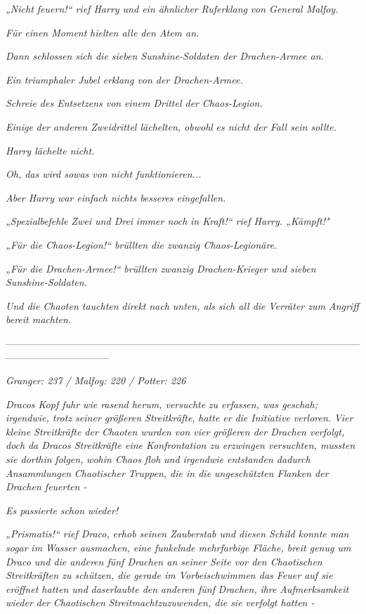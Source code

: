 {\emph{„Nicht feuern!“ rief Harry und ein ähnlicher} \emph{Ruferklang} \emph{von General Malfoy.}

\emph{Für einen Moment} \emph{hielten alle den Atem an.}

\emph{Dann schlossen sich die sieben Sunshine-Soldaten der Drachen-Armee an.}

\emph{Ein triumphaler Jubel erklang von der Drachen-Armee.}

\emph{Schreie des Entsetzens von} \emph{einem Drittel der} \emph{Chaos-Legion.}

\emph{Einige} \emph{der anderen Zweidrittel lächelten, obwohl} \emph{es nicht der Fall sein sollte.}

\emph{Harry lächelte nicht.}

\emph{\emph{Oh, das wird sowas von nicht funktionieren...}}

\emph{Aber Harry war einfach nichts besseres eingefallen.}

\emph{„Spezialbefehle Zwei und Drei} \emph{immer noch} \emph{in Kraft!“ rief Harry. „Kämpft!"}

\emph{„\emph{Für die Chaos-Legion!}“ brüllten die zwanzig Chaos-Legionäre.}

\emph{„\emph{Für die Drachen-Armee!}“ brüllten zwanzig Drachen-Krieger und sieben Sunshine-Soldaten.}

\emph{Und die Chaoten tauchten} \emph{direkt} \emph{nach unten, als} \emph{sich all die} \emph{Verräter zum Angriff bereit machten.}

--------------------------------------------------------------------------------------------------------------------------------------------

\hfill\break \emph{Granger: 237 / Malfoy: 220 / Potter: 226}

\emph{Dracos Kopf fuhr wie rasend herum, versuchte} \emph{zu erfassen, was geschah; irgendwie, trotz seiner größeren Streitkräfte,} \emph{hatte er} \emph{\emph{die Initiative verloren.}} \emph{Vier kleine Streitkräfte der Chaoten wurden von vier größeren der Drachen verfolgt,} \emph{doch} \emph{da Dracos Streitkräfte eine Konfrontation zu erzwingen versuchten, mussten sie dorthin} \emph{\emph{folgen,}} \emph{wohin Chaos} \emph{\emph{floh}} \emph{und irgendwie entstanden dadurch} \emph{Ansammlungen} \emph{Chaotischer} \emph{Truppen, die in die ungeschützten Flanken der Drachen feuerten -}

\emph{Es passierte} \emph{\emph{schon wieder!}}

\emph{„\emph{Prismatis!}“ rief Draco,} \emph{erhob seinen Zauberstab und diesen Schild konnte man sogar} \emph{im} \emph{Wasser ausmachen, eine funkelnde mehrfarbige Fläche, breit genug um Draco und die anderen fünf Drachen an seiner Seite vor den Chaotischen Streitkräften zu schützen, die gerade im Vorbeischwimmen das Feuer auf sie eröffnet hatten und} \emph{\emph{das}erlaubte den} \emph{anderen fünf} \emph{Drachen,} \emph{\emph{ihre}} \emph{Aufmerksamkeit} \emph{wieder} \emph{der} \emph{Chaotischen} \emph{Streitmachtzuzuwenden, die sie verfolgt hatten -}

}
